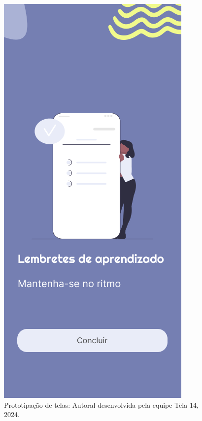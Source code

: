 \documentclass[12pt, openany, oneside, a4paper, english, brazil]{abntex2}   %
\begin{document}
\begin{figure}
    \centering
    \includegraphics[scale=0.7]{figuras/Math.Pow App/reminders.png}
    \caption{Prototipação de telas: Autoral desenvolvida pela equipe Tela 14, 2024.}
    \label{fig:nome-da-imagem}
\end{figure}
\end{document}
